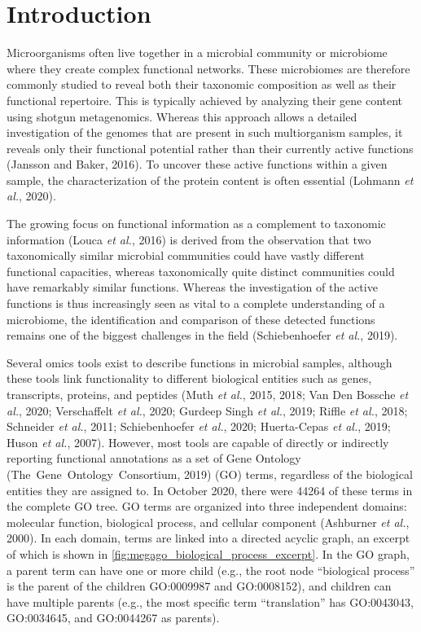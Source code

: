 \hypertarget{introduction-2}{%
\section{Introduction}\label{introduction-2}}

Microorganisms often live together in a microbial community or
microbiome where they create complex functional networks. These
microbiomes are therefore commonly studied to reveal both their
taxonomic composition as well as their functional repertoire. This is
typically achieved by analyzing their gene content using shotgun
metagenomics. Whereas this approach allows a detailed investigation of
the genomes that are present in such multiorganism samples, it reveals
only their functional potential rather than their currently active
functions (Jansson and Baker, 2016). To uncover these active functions
within a given sample, the characterization of the protein content is
often essential (Lohmann \emph{et al.}, 2020).

The growing focus on functional information as a complement to taxonomic
information (Louca \emph{et al.}, 2016) is derived from the observation
that two taxonomically similar microbial communities could have vastly
different functional capacities, whereas taxonomically quite distinct
communities could have remarkably similar functions. Whereas the
investigation of the active functions is thus increasingly seen as vital
to a complete understanding of a microbiome, the identification and
comparison of these detected functions remains one of the biggest
challenges in the field (Schiebenhoefer \emph{et al.}, 2019).

Several omics tools exist to describe functions in microbial samples,
although these tools link functionality to different biological entities
such as genes, transcripts, proteins, and peptides (Muth \emph{et al.},
2015, 2018; Van Den Bossche \emph{et al.}, 2020; Verschaffelt \emph{et
al.}, 2020; Gurdeep Singh \emph{et al.}, 2019; Riffle \emph{et al.},
2018; Schneider \emph{et al.}, 2011; Schiebenhoefer \emph{et al.}, 2020;
Huerta-Cepas \emph{et al.}, 2019; Huson \emph{et al.}, 2007). However,
most tools are capable of directly or indirectly reporting functional
annotations as a set of Gene Ontology (The~Gene~Ontology~Consortium,
2019) (GO) terms, regardless of the biological entities they are
assigned to. In October 2020, there were 44264 of these terms in the
complete GO tree. GO terms are organized into three independent domains:
molecular function, biological process, and cellular component
(Ashburner \emph{et al.}, 2000). In each domain, terms are linked into a
directed acyclic graph, an excerpt of which is shown in
\autoref{fig:megago_biological_process_excerpt}. In the GO graph, a
parent term can have one or more child (e.g., the root node ``biological
process'' is the parent of the children GO:0009987 and GO:0008152), and
children can have multiple parents (e.g., the most specific term
``translation'' has GO:0043043, GO:0034645, and GO:0044267 as parents).

